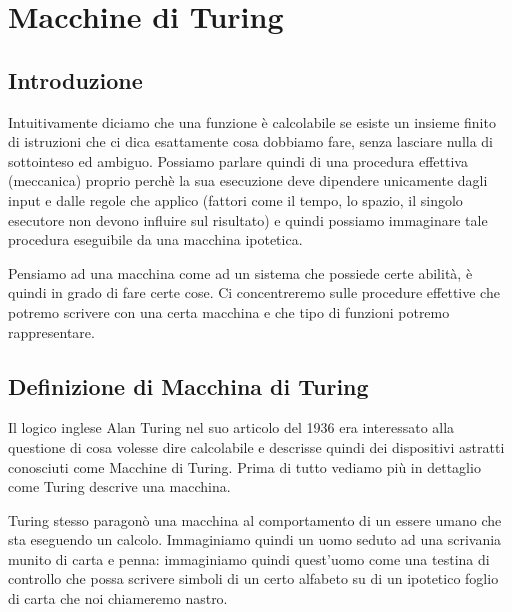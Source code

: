 \newcommand{\bew}{\mathsf{Bew}}
\newcommand{\eq}[1]{\begin{equation} #1 \end{equation}}
\newcommand{\gdnum}[1]{\ulcorner #1 \urcorner}
\newcommand{\eqconnome}[2]{\begin{equation} \label{eq:#2} #1 \end{equation}}

\chapter{Macchine di Turing}

\section{Introduzione}
Intuitivamente diciamo che una funzione \`e calcolabile se esiste un insieme
finito di istruzioni che ci dica esattamente cosa dobbiamo fare, senza lasciare
nulla di sottointeso ed ambiguo. Possiamo parlare quindi di una procedura
effettiva (meccanica) proprio perch\`e la sua esecuzione deve dipendere
unicamente dagli input e dalle regole che applico (fattori come il tempo, lo
spazio, il singolo esecutore non devono influire sul risultato) e quindi
possiamo immaginare tale procedura eseguibile da una macchina ipotetica.

Pensiamo ad una macchina come ad un sistema che possiede certe abilit\`a, \`e
quindi in grado di fare certe cose. Ci concentreremo sulle procedure effettive
che potremo scrivere con una certa macchina e che tipo di funzioni potremo
rappresentare.

\section{Definizione di Macchina di Turing}
Il logico inglese Alan Turing nel suo articolo del 1936 era interessato alla
questione di cosa volesse dire calcolabile e descrisse quindi dei dispositivi
astratti conosciuti come Macchine di Turing. Prima di tutto vediamo pi\`u in
dettaglio come Turing descrive una macchina.

Turing stesso paragon\`o una macchina al comportamento di un essere umano che
sta eseguendo un calcolo.  Immaginiamo quindi un uomo seduto ad una scrivania
munito di carta e penna: immaginiamo quindi quest'uomo come una testina di
controllo che possa scrivere simboli di un certo alfabeto su di un ipotetico
foglio di carta che noi chiameremo nastro.

